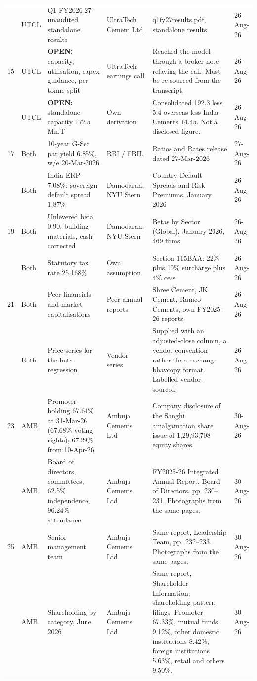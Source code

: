 {\begin{tabular}{@{}p{}p{}p{}p{}p{}p{}@{}}
\arow 14 & UTCL & Q1 FY2026-27 unaudited standalone results & UltraTech Cement Ltd & q1fy27results.pdf, standalone results & 26-Aug-26\\
15 & UTCL & \textbf{OPEN:} capacity, utilisation, capex guidance, per-tonne split & UltraTech earnings call & Reached the model through a broker note relaying the call. Must be re-sourced from the transcript. & 26-Aug-26\\
\arow 16 & UTCL & \textbf{OPEN:} standalone capacity 172.5 Mn.T & Own derivation & Consolidated 192.3 less 5.4 overseas less India Cements 14.45. Not a disclosed figure. & 26-Aug-26\\
17 & Both & 10-year G-Sec par yield 6.85\%, w/e 20-Mar-2026 & RBI / FBIL & Ratios and Rates release dated 27-Mar-2026 & 27-Aug-26\\
\arow 18 & Both & India ERP 7.08\%; sovereign default spread 1.87\% & Damodaran, NYU Stern & Country Default Spreads and Risk Premiums, January 2026 & 26-Aug-26\\
19 & Both & Unlevered beta 0.90, building materials, cash-corrected & Damodaran, NYU Stern & Betas by Sector (Global), January 2026, 469 firms & 26-Aug-26\\
\arow 20 & Both & Statutory tax rate 25.168\% & Own assumption & Section 115BAA: 22\% plus 10\% surcharge plus 4\% cess & 26-Aug-26\\
21 & Both & Peer financials and market capitalisations & Peer annual reports & Shree Cement, JK Cement, Ramco Cements, own FY2025-26 reports & 26-Aug-26\\
\arow 22 & Both & Price series for the beta regression & Vendor series & Supplied with an adjusted-close column, a vendor convention rather than exchange bhavcopy format. Labelled vendor-sourced. & 26-Aug-26\\
23 & AMB & Promoter holding 67.64\% at 31-Mar-26 (67.68\% voting rights); 67.29\% from 10-Apr-26 & Ambuja Cements Ltd & Company disclosure of the Sanghi amalgamation share issue of 1,29,93,708 equity shares. & 30-Aug-26\\
\arow 24 & AMB & Board of directors, committees, 62.5\% independence, 96.24\% attendance & Ambuja Cements Ltd & FY2025-26 Integrated Annual Report, Board of Directors, pp. 230--231. Photographs from the same pages. & 30-Aug-26\\
25 & AMB & Senior management team & Ambuja Cements Ltd & Same report, Leadership Team, pp. 232--233. Photographs from the same pages. & 30-Aug-26\\
\arow 26 & AMB & Shareholding by category, June 2026 & Ambuja Cements Ltd & Same report, Shareholder Information; shareholding-pattern filings. Promoter 67.33\%, mutual funds 9.12\%, other domestic institutions 8.42\%, foreign institutions 5.63\%, retail and others 9.50\%. & 30-Aug-26\\

\end{tabular}}
